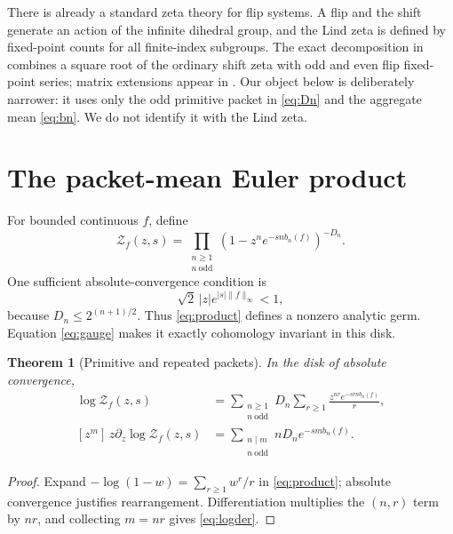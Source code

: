 \documentclass[11pt]{article}
\newtheorem{theorem}{Theorem}[section]
\newcommand{\Zpack}{\mathcal Z}
\begin{document}
There is already a standard zeta theory for flip systems.  A flip and the
shift generate an action of the infinite dihedral group, and the Lind zeta is
defined by fixed-point counts for all finite-index subgroups.  The exact
decomposition in \citet{KimLeePark2003} combines a square root of the ordinary
shift zeta with odd and even flip fixed-point series; matrix extensions appear
in \citet{Ryu2019}.  Our object below is deliberately narrower: it uses only
the odd primitive packet in \eqref{eq:Dn} and the aggregate mean
\eqref{eq:bn}.  We do not identify it with the Lind zeta.

\section{The packet-mean Euler product}

For bounded continuous $f$, define
\begin{equation}\label{eq:product}
 \Zpack_f(z,s)=\prod_{\substack{n\ge1\\n\ \mathrm{odd}}}
 \left(1-z^n e^{-sn b_n(f)}\right)^{-D_n}.
\end{equation}
One sufficient absolute-convergence condition is
\begin{equation}\label{eq:safedisk}
 \sqrt2\,|z|e^{|s|\lVert f\rVert_\infty}<1,
\end{equation}
because $D_n\le2^{(n+1)/2}$.  Thus \eqref{eq:product} defines a nonzero
analytic germ.  Equation \eqref{eq:gauge} makes it exactly cohomology
invariant in this disk.

\begin{theorem}[Primitive and repeated packets]\label{thm:ledger}
In the disk of absolute convergence,
\begin{align}
 \log\Zpack_f(z,s)
 &=\sum_{\substack{n\ge1\\n\ \mathrm{odd}}}D_n
   \sum_{r\ge1}\frac{z^{nr}e^{-srn b_n(f)}}{r},\label{eq:log}\\
 [z^m]\,z\partial_z\log\Zpack_f(z,s)
 &=\sum_{\substack{n\mid m\\n\ \mathrm{odd}}}
 nD_ne^{-sm b_n(f)}.\label{eq:logder}
\end{align}
\end{theorem}

\begin{proof}
Expand $-\log(1-w)=\sum_{r\ge1}w^r/r$ in \eqref{eq:product}; absolute
convergence justifies rearrangement.  Differentiation multiplies the
$(n,r)$ term by $nr$, and collecting $m=nr$ gives \eqref{eq:logder}.
\end{proof}
\end{document}
